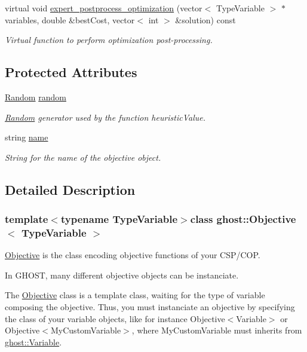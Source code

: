 \begin{DoxyCompactItemize}
virtual void \hyperlink{classghost_1_1Objective_ab34e47a60acd0ea573933ae652f89c36}{expert\-\_\-postprocess\-\_\-optimization} (vector$<$ Type\-Variable $>$ $\ast$variables, double \&best\-Cost, vector$<$ int $>$ \&solution) const 
\begin{DoxyCompactList}\small\item\em Virtual function to perform optimization post-\/processing. \end{DoxyCompactList}\end{DoxyCompactItemize}
\subsection*{Protected Attributes}
\begin{DoxyCompactItemize}
\item 
\hyperlink{classghost_1_1Random}{Random} \hyperlink{classghost_1_1Objective_ae4b72b2e592243707f478ec1adbef234}{random}
\begin{DoxyCompactList}\small\item\em \hyperlink{classghost_1_1Random}{Random} generator used by the function heuristic\-Value. \end{DoxyCompactList}\item 
string \hyperlink{classghost_1_1Objective_a02aee324f6958b6c533f27ec430690fe}{name}
\begin{DoxyCompactList}\small\item\em String for the name of the objective object. \end{DoxyCompactList}\end{DoxyCompactItemize}


\subsection{Detailed Description}
\subsubsection*{template$<$typename Type\-Variable$>$class ghost\-::\-Objective$<$ Type\-Variable $>$}

\hyperlink{classghost_1_1Objective}{Objective} is the class encoding objective functions of your C\-S\-P/\-C\-O\-P. 

In G\-H\-O\-S\-T, many different objective objects can be instanciate.

The \hyperlink{classghost_1_1Objective}{Objective} class is a template class, waiting for the type of variable composing the objective. Thus, you must instanciate an objective by specifying the class of your variable objects, like for instance Objective$<$\-Variable$>$ or Objective$<$\-My\-Custom\-Variable$>$, where My\-Custom\-Variable must inherits from \hyperlink{classghost_1_1Variable}{ghost\-::\-Variable}.

